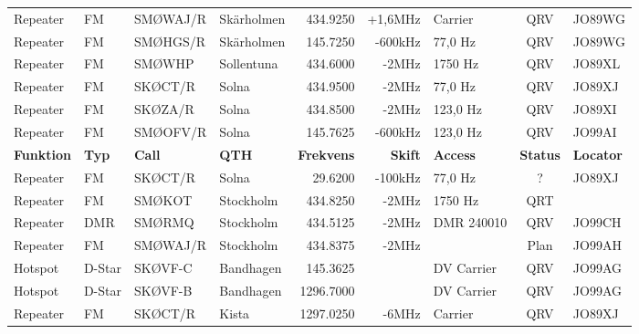 \documentclass[10pt,swedish,a4paper,twoside]{article}
\begin{document}
\begin{landscape}
\begin{longtable}{llllrrlcl}
	Repeater          & FM           & SMØWAJ/R      & Skärholmen   &          434.9250 &        +1,6MHz & Carrier         &       QRV       & JO89WG           \\
	Repeater          & FM           & SMØHGS/R      & Skärholmen   &          145.7250 &        -600kHz & 77,0 Hz         &       QRV       & JO89WG           \\
	Repeater          & FM           & SMØWHP        & Sollentuna   &          434.6000 &          -2MHz & 1750 Hz         &       QRV       & JO89XL           \\
	Repeater          & FM           & SKØCT/R       & Solna        &          434.9500 &          -2MHz & 77,0 Hz         &       QRV       & JO89XJ           \\
	Repeater          & FM           & SKØZA/R       & Solna        &          434.8500 &          -2MHz & 123,0 Hz        &       QRV       & JO89XI           \\
	Repeater          & FM           & SMØOFV/R      & Solna        &          145.7625 &        -600kHz & 123,0 Hz        &       QRV       & JO99AI           \\
	\textbf{Funktion} & \textbf{Typ} & \textbf{Call} & \textbf{QTH} & \textbf{Frekvens} & \textbf{Skift} & \textbf{Access} & \textbf{Status} & \textbf{Locator} \\ \hline
	Repeater          & FM           & SKØCT/R       & Solna        &           29.6200 &        -100kHz & 77,0 Hz         &        ?        & JO89XJ           \\
	Repeater          & FM           & SMØKOT        & Stockholm    &          434.8250 &          -2MHz & 1750 Hz         &       QRT       &  \\
	Repeater          & DMR          & SMØRMQ        & Stockholm    &          434.5125 &          -2MHz & DMR 240010      &       QRV       & JO99CH           \\
	Repeater          & FM           & SMØWAJ/R      & Stockholm    &          434.8375 &          -2MHz &                 &      Plan       & JO99AH           \\
	Hotspot           & D-Star       & SKØVF-C       & Bandhagen    &          145.3625 &                & DV Carrier      &       QRV       & JO99AG           \\
	Hotspot           & D-Star       & SKØVF-B       & Bandhagen    &         1296.7000 &                & DV Carrier      &       QRV       & JO99AG           \\
	Repeater          & FM           & SKØCT/R       & Kista        &         1297.0250 &          -6MHz & Carrier         &       QRV       & JO89XJ           \\

\end{longtable}
\end{landscape}
\end{document}
